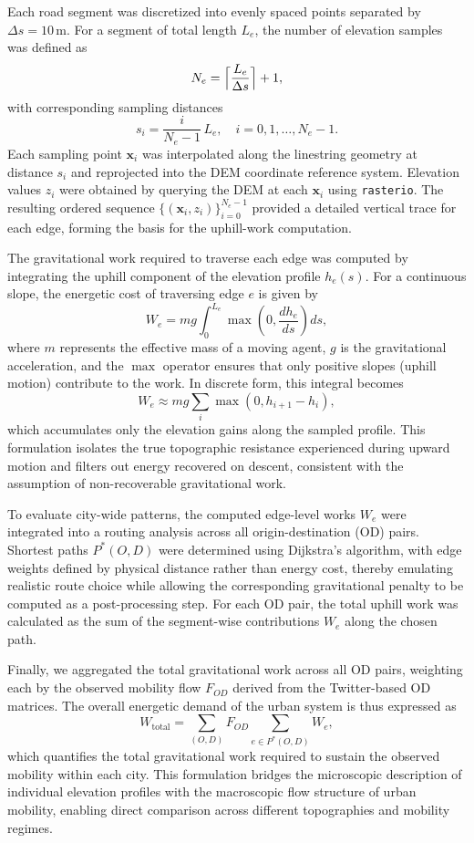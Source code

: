 \documentclass[twocolumn,amsmath,amssymb,floatfix,nature,shownopacs,footinbib,superscriptaddress]{revtex4-1} %
\begin{document}
Each road segment was discretized into evenly spaced points separated by $\Delta s = 10\,\mathrm{m}$. 
For a segment of total length $L_e$, the number of elevation samples was defined as
\[
N_e = \Bigl\lceil \frac{L_e}{\Delta s} \Bigr\rceil + 1,
\]
with corresponding sampling distances
\[
s_i = \frac{i}{N_e - 1}\,L_e,
\quad i = 0,1,\dots,N_e-1.
\]
Each sampling point $\mathbf{x}_i$ was interpolated along the linestring geometry at distance $s_i$ and reprojected into the DEM coordinate reference system. 
Elevation values $z_i$ were obtained by querying the DEM at each $\mathbf{x}_i$ using \texttt{rasterio}. 
The resulting ordered sequence $\{(\mathbf{x}_i, z_i)\}_{i=0}^{N_e-1}$ provided a detailed vertical trace for each edge, forming the basis for the uphill-work computation.

The gravitational work required to traverse each edge was computed by integrating the uphill component of the elevation profile $h_e(s)$. 
For a continuous slope, the energetic cost of traversing edge $e$ is given by
\[
W_e = m g \int_0^{L_e} \max\!\left(0, \frac{dh_e}{ds}\right) ds,
\]
where $m$ represents the effective mass of a moving agent, $g$ is the gravitational acceleration, and the $\max$ operator ensures that only positive slopes (uphill motion) contribute to the work. 
In discrete form, this integral becomes
\[
W_e \approx m g \sum_i \max(0, h_{i+1} - h_i),
\]
which accumulates only the elevation gains along the sampled profile. 
This formulation isolates the true topographic resistance experienced during upward motion and filters out energy recovered on descent, consistent with the assumption of non-recoverable gravitational work.

To evaluate city-wide patterns, the computed edge-level works $W_e$ were integrated into a routing analysis across all origin-destination (OD) pairs. 
Shortest paths $P^*(O,D)$ were determined using Dijkstra's algorithm, with edge weights defined by physical distance rather than energy cost, thereby emulating realistic route choice while allowing the corresponding gravitational penalty to be computed as a post-processing step. 
For each OD pair, the total uphill work was calculated as the sum of the segment-wise contributions $W_e$ along the chosen path.

Finally, we aggregated the total gravitational work across all OD pairs, weighting each by the observed mobility flow $F_{OD}$ derived from the Twitter-based OD matrices. 
The overall energetic demand of the urban system is thus expressed as
\[
W_{\text{total}} = \sum_{(O,D)} F_{OD} \sum_{e \in P^*(O,D)} W_e,
\]
which quantifies the total gravitational work required to sustain the observed mobility within each city. 
This formulation bridges the microscopic description of individual elevation profiles with the macroscopic flow structure of urban mobility, enabling direct comparison across different topographies and mobility regimes.
\end{document}
